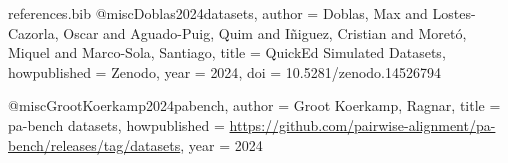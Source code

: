 \begin{filecontents*}[overwrite]{references.bib}
@misc{Doblas2024datasets,
  author       = {Doblas, Max and Lostes-Cazorla, Oscar and Aguado-Puig, Quim and I{\~n}iguez, Cristian and Moret{\'o}, Miquel and Marco-Sola, Santiago},
  title        = {{QuickEd} Simulated Datasets},
  howpublished = {Zenodo},
  year         = {2024},
  doi          = {10.5281/zenodo.14526794}
}

@misc{GrootKoerkamp2024pabench,
  author       = {Groot Koerkamp, Ragnar},
  title        = {pa-bench datasets},
  howpublished = {\url{https://github.com/pairwise-alignment/pa-bench/releases/tag/datasets}},
  year         = {2024}
}
\end{filecontents*}
\documentclass[numsec,webpdf,modern,large]{oup-authoring-template}
\usepackage{booktabs}
\newcommand{\dinara}{dinara-align}


